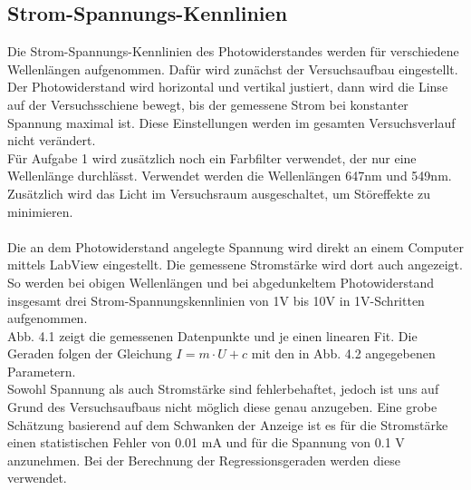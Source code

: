 \subsection{Strom-Spannungs-Kennlinien}


Die Strom-Spannungs-Kennlinien des Photowiderstandes werden für verschiedene Wellenlängen aufgenommen. Dafür wird zunächst der Versuchsaufbau eingestellt. Der Photowiderstand wird horizontal und vertikal justiert, dann wird die Linse auf der Versuchsschiene bewegt, bis der gemessene Strom bei konstanter Spannung maximal ist. Diese Einstellungen werden im gesamten Versuchsverlauf nicht verändert. \\
Für Aufgabe 1 wird zusätzlich noch ein Farbfilter verwendet, der nur eine Wellenlänge durchlässt. Verwendet werden die Wellenlängen 647nm und 549nm. Zusätzlich wird das Licht im Versuchsraum ausgeschaltet, um Störeffekte zu minimieren. \\
\\
Die an dem Photowiderstand angelegte Spannung wird direkt an einem Computer mittels LabView eingestellt. Die gemessene Stromstärke wird dort auch angezeigt. So werden bei obigen Wellenlängen und bei abgedunkeltem Photowiderstand insgesamt drei Strom-Spannungskennlinien von 1V bis 10V in 1V-Schritten aufgenommen. \\
Abb. 4.1 zeigt die gemessenen Datenpunkte und je einen linearen Fit. Die Geraden folgen der Gleichung $I = m \cdot U + c$ mit den in Abb. 4.2 angegebenen Parametern. \\
Sowohl Spannung als auch Stromstärke sind fehlerbehaftet, jedoch ist uns auf Grund des Versuchsaufbaus nicht möglich diese genau anzugeben. Eine grobe Schätzung basierend auf dem Schwanken der Anzeige ist es für die Stromstärke einen statistischen Fehler von 0.01 mA und für die Spannung von 0.1 V anzunehmen. Bei der Berechnung der Regressionsgeraden werden diese verwendet.

